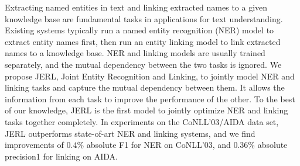 Extracting named entities in text and linking extracted names to a given knowledge base are fundamental tasks in applications for text understanding. Existing systems typically run a named entity recognition (NER) model to extract entity names first, then run an entity linking model to link extracted names to a knowledge base. NER and linking models are usually trained separately, and the mutual dependency between the two tasks is ignored. We propose JERL, Joint Entity Recognition and Linking, to jointly model NER and linking tasks and capture the mutual dependency between them. It allows the information from each task to improve the performance of the other. To the best of our knowledge, JERL is the first model to jointly optimize NER and linking tasks together completely. In experiments on the CoNLL'03/AIDA data set, JERL outperforms state-of-art NER and linking systems, and we find improvements of 0.4\% absolute F1 for NER on CoNLL'03, and 0.36\% absolute precision\@1 for linking on AIDA.
